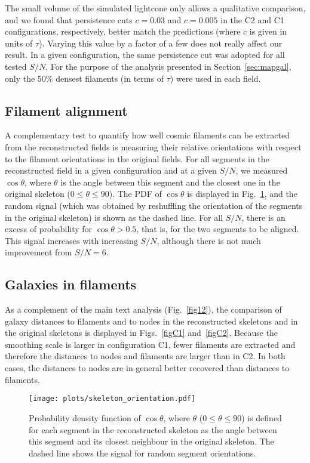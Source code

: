 \documentclass{aa}
\begin{document}
{{{{{{{{{{{{{{The small volume of the simulated lightcone only allows a qualitative comparison, and we found that  persistence cuts $c=0.03$ and $c=0.005$ in the C2 and C1 configurations, respectively, better match the predictions (where $c$ is given in units of $\tau$). Varying this value by a factor of a few does not really affect our result. 
In a given configuration, the same persistence cut was adopted for all tested $S/N$.
For the purpose of the analysis presented in Section~\ref{sec:mapgal}, only the 50\% densest filaments (in terms of $\tau$) were used in each field. 

\subsection{Filament alignment}
A complementary test to quantify how well cosmic filaments can be extracted from the reconstructed fields is measuring their relative orientations with respect to the filament orientations in the original fields. 
For all segments in the reconstructed field in a given configuration and at a given $S/N$, we measured $\cos \theta$, where $\theta$ is the angle between this segment and the closest one in the original skeleton ($0\leq\theta\leq90$). The PDF of $\cos \theta$ is displayed in Fig.~\ref{figC6}, and the random signal (which was obtained by reshuffling the orientation of the segments in the original skeleton)  is shown as the dashed line.  For all $S/N$, there is an excess of probability for $\cos \theta>0.5$, that is, for the two segments to be aligned. This signal increases with increasing $S/N$, although there is not much improvement from $S/N=6$. 


\subsection{Galaxies in filaments}
\label{Ap:galinfil}
As a complement of the main text analysis (Fig.~\ref{fig12}), the comparison of galaxy distances to filaments and to nodes in the reconstructed skeletons and in the original skeletons is displayed in Figs.~\ref{figC1} and~\ref{figC2}. Because the smoothing scale is larger in configuration C1, fewer filaments are extracted and therefore the distances to nodes and filaments are larger than in C2. In both cases, the distances to nodes are in general better recovered than distances to filaments. 


\begin{figure}
\begin{center}
\texttt{[image: plots/skeleton\_orientation.pdf]}
\caption{Probability density function of $\cos \theta$, where $ \theta$ ($0\leq\theta\leq90$) is defined for each segment in the reconstructed skeleton as the angle between this segment and its closest neighbour in the original skeleton. The dashed line shows the signal for random segment orientations. }
\label{figC6}
\end{center}
\end{figure}


}}}}}}}}}}}}}}
\end{document}
